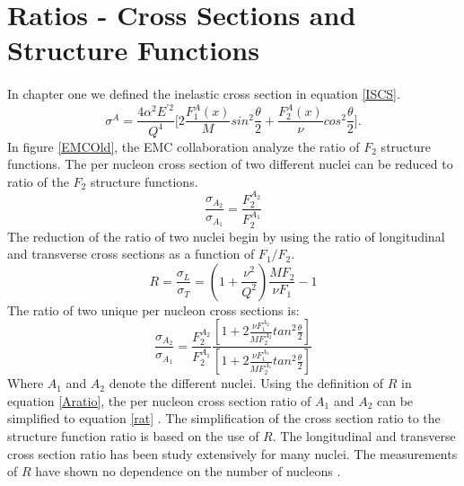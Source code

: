 \section{Ratios - Cross Sections and Structure Functions}
\paragraph{}In chapter one we defined the  inelastic cross section in equation \ref{ISCS}.  
\begin{equation}
\label{ISCSch2}
\sigma^A=\frac{4\alpha^2E^{\prime 2}}{Q^4} \bigg\lbrack 2\frac{F_1^A(x)}{M}sin^2\frac{\theta}{2} + \frac{F_2^A(x)}{\nu}cos^2\frac{\theta}{2} \bigg \rbrack.
\end{equation} 
In figure \ref{EMCOld}, the EMC collaboration analyze the ratio of $F_2$ structure functions. The per nucleon cross section of two different nuclei can be reduced to ratio of the $F_2$ structure functions.  
\begin{equation}
\label{rat}
\frac{\sigma_{A_2}}{\sigma_{A_1}} = \frac{F_2^{A_2}}{F_2^{A_1}}
\end{equation}
The reduction of the ratio of two nuclei begin by using the ratio of longitudinal and transverse cross sections as a function of $F_1/F_2$.
\begin{equation}
R=\frac{\sigma_{L}}{\sigma_{T}} =\left(1+\frac{\nu^2}{Q^2} \right)\frac{MF_2}{\nu F_1} -1
\label{Rratio}
\end{equation}
The ratio of two unique per nucleon cross sections is:
\begin{equation}
\label{Aratio}
\frac{\sigma_{A_2}}{\sigma_{A_1}} = \frac{F_2^{A_2}}{F_2^{A_1}} \frac{\left[1+ 2\frac{\nu F_1^{A_2} }{MF_2^{A_2}} tan^2\frac{\theta}{2} \right]}{\left[1+ 2\frac{\nu F_1^{A_1} }{MF_2^{A_1}} tan^2\frac{\theta}{2} \right]}
\end{equation}
Where $A_1$ and $A_2$ denote the different nuclei. Using the definition of $R$ in equation \ref{Aratio}, the per nucleon cross section ratio of $A_1$ and $A_2$ can be simplified to equation \ref{rat} \cite{EM,seelyth}. The simplification of the cross section ratio to the structure function ratio is based on the use of $R$. The longitudinal and transverse cross section ratio has been study extensively for many nuclei. The measurements of $R$ have shown no dependence on the number of nucleons \cite{EM}. 
